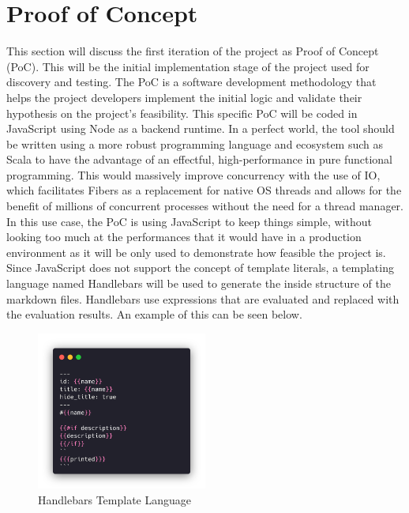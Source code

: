 \section{Proof of Concept}
\label{s:Proof of Concept}
This section will discuss the first iteration of the project as Proof of Concept
(PoC). This will be the initial implementation stage of the project used for
discovery and testing. The PoC is a software development methodology that helps
the project developers implement the initial logic and validate their hypothesis
on the project's feasibility. This specific PoC will be coded in JavaScript
using Node as a backend runtime. In a perfect world, the tool should be written
using a more robust programming language and ecosystem such as Scala to have the
advantage of an effectful, high-performance in pure functional programming. This
would massively improve concurrency with the use of IO, which facilitates Fibers
as a replacement for native OS threads and allows for the benefit of millions of
concurrent processes without the need for a thread manager. In this use case,
the PoC is using JavaScript to keep things simple, without looking too much at
the performances that it would have in a production environment as it will be
only used to demonstrate how feasible the project is. Since JavaScript does not
support the concept of template literals, a templating language named Handlebars
will be used to generate the inside structure of the markdown files. Handlebars
use expressions that are evaluated and replaced with the evaluation results. An
example of this can be seen below.

\begin{figure}[H]
  \centering
  \includegraphics[width=0.5\textwidth]{figures/code/handlebars.png}
  \caption{Handlebars Template Language}
  \label{f:ch5-handlebars-template-language}
\end{figure}

